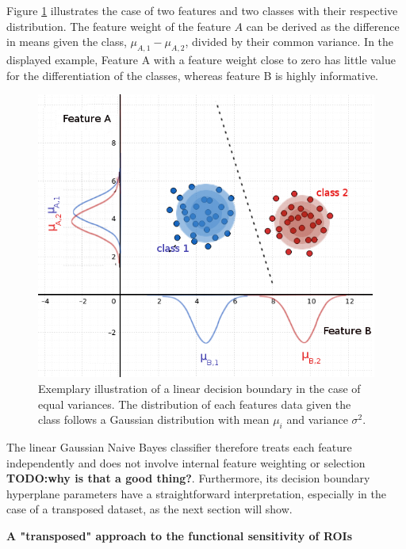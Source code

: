 \documentclass[a4paper, 12pt]{scrreprt}
\begin{document}
Figure \ref{GNB} illustrates the case of two features and two classes with their respective distribution. The feature weight of the feature $A$ can be derived as the difference in means given the class, $\mu_{A, 1} - \mu_{A, 2}$, divided by their common variance. In the displayed example, Feature A with a feature weight close to zero has little value for the differentiation of the classes, whereas feature B is highly informative. \newline

\begin{figure}[H]
	\includegraphics[scale=0.5]{img/improved_GNB.png}
	\caption[A linear decision boundery for a linear Gaussian Naive Bayes classifier]{\small{Exemplary illustration of a linear decision boundary in the case of equal variances. The distribution of each features data given the class follows a Gaussian distribution with mean $\mu_i$ and variance $\sigma^2$.}}
	\label{GNB}
\end{figure}

The linear Gaussian Naive Bayes classifier therefore treats each feature independently and does not involve internal feature weighting or selection  \textbf{TODO:why is that a good thing?}. Furthermore, its decision boundary hyperplane parameters have a straightforward interpretation, especially in the case of a transposed dataset, as the next section will show.
\bigskip


\noindent \textbf{A "transposed" approach to the functional sensitivity of ROIs}\hfill
\medskip
\end{document}
